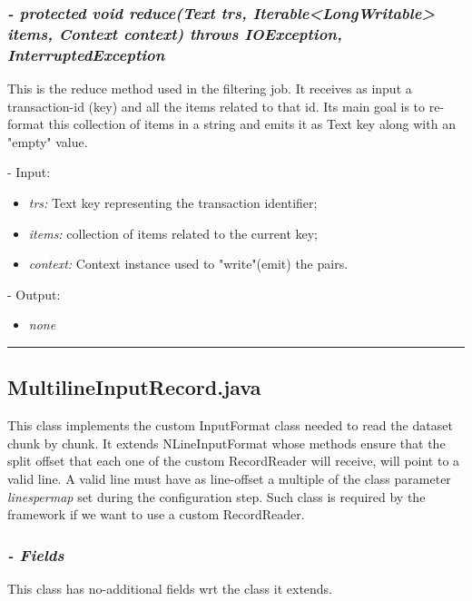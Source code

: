 \documentclass[]{report}
\begin{document}
	\subsubsection*{\textit{\textbf{-} 	protected void reduce(Text trs, Iterable<LongWritable> items, Context context) throws IOException, InterruptedException}}   	
	This is the reduce method used in the filtering job. It receives as input a transaction-id (key) and all the items related to that id. Its main goal is to re-format this collection of items in a string and emits it as Text key along with an "empty" value.     
	\begin{description}
		\item - Input:
		\begin{itemize}
			\item \textit{trs:} Text key representing the transaction identifier;
			\item \textit{items:} collection of items related to the current key;
			\item \textit{context:} Context instance used to "write"(emit) the pairs.
		\end{itemize}
	\end{description}	
	\begin{description}
		\item - Output:
		\begin{itemize}
			\item \textit{none} 
		\end{itemize}
	\end{description}
	
	\rule{\textwidth}{0.4pt}

		
	\subsection*{MultilineInputRecord.java}
	This class implements the custom InputFormat class needed to read the dataset chunk by chunk. It extends NLineInputFormat whose methods ensure that the split offset that each one of the custom RecordReader will receive, will point to a valid line. A valid line must have as line-offset a multiple of the class parameter \textit{linespermap} set during the configuration step. Such class is required by the framework if we want to use a custom RecordReader.    
	
	\subsubsection*{\textit{\textbf{-} Fields}} 
	This class has no-additional fields wrt the class it extends.
	
\end{document}
